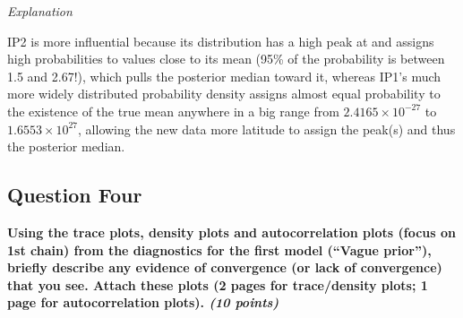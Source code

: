 \documentclass[
  11pt,
]{article}
\begin{document}
\textit{Explanation}

IP2 is more influential because its distribution has a high peak at and
assigns high probabilities to values close to its mean (95\% of the
probability is between 1.5 and 2.67!), which pulls the posterior median
toward it, whereas IP1's much more widely distributed probability
density assigns almost equal probability to the existence of the true
mean anywhere in a big range from \ensuremath{2.4165\times 10^{-27}} to
\ensuremath{1.6553\times 10^{27}}, allowing the new data more latitude
to assign the peak(s) and thus the posterior median.

\pagebreak

\hypertarget{question-four}{%
\subsection{Question Four}\label{question-four}}

\textbf{Using the trace plots, density plots and autocorrelation plots (focus on 1st chain) from the diagnostics for the first model (“Vague prior”), briefly describe any evidence of convergence (or lack of convergence) that you see. Attach these plots (2 pages for trace/density plots; 1 page for autocorrelation plots). \textit{(10 points)}}
\end{document}
